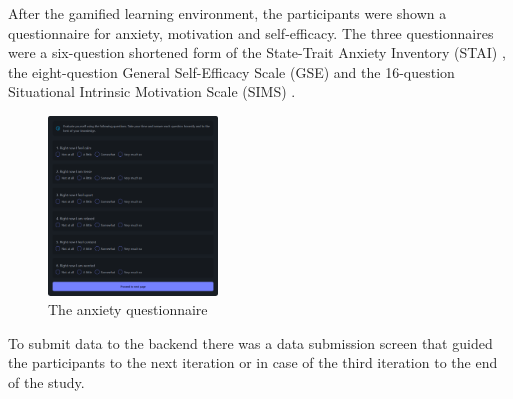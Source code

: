 After the gamified learning environment, the participants were shown a questionnaire for anxiety, motivation and self-efficacy.
The three questionnaires were a six-question shortened form of the State-Trait Anxiety Inventory (STAI) \parencite{marteauDevelopmentSixitemShortform1992}, the eight-question General Self-Efficacy Scale (GSE) \parencite{guayAssessmentSituationalIntrinsic2000} and the 16-question Situational Intrinsic Motivation Scale (SIMS) \parencite{chenValidationNewGeneral2001}.
\begin{figure}[H]
  \centering
  \includegraphics[width=0.4\textwidth]{img/Stai.png}
  \caption{The anxiety questionnaire}
  \label{fig:figureAnxiety}
\end{figure}
To submit data to the backend there was a data submission screen that guided the participants to the next iteration or in case of the third iteration to the end of the study.

